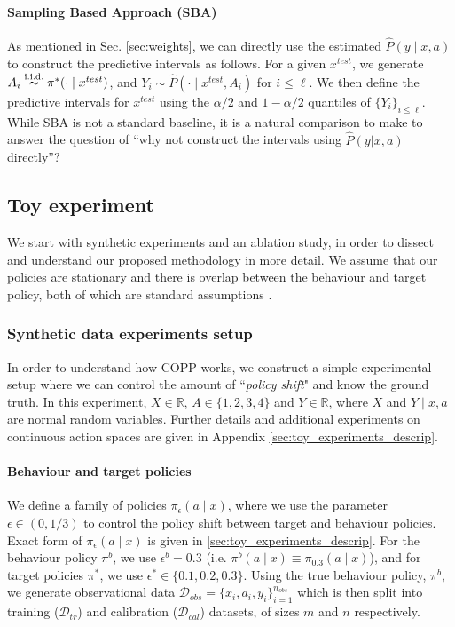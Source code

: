 \paragraph{Sampling Based Approach (SBA)} As mentioned in Sec. \ref{sec:weights}, we can directly use the estimated $\hat{P}(y\mid x, a)$ to construct the predictive intervals as follows. For a given $x^{test}$, we generate $A_i \overset{\textup{i.i.d.}}{\sim} \pi^*(\cdot \mid x^{test})$, and $Y_i \sim \hat{P}(\cdot \mid x^{test}, A_i)$ for $i \leq \ell$. We then define the predictive intervals for $x^{test}$ using the $\alpha/2$ and $1-\alpha/2$ quantiles of $\{Y_i\}_{i \leq \ell}$. While SBA is not a standard baseline, it is a natural comparison to make to answer the question of ``why not construct the intervals using $\hat{P}(y|x, a)$ directly''?


\subsection{Toy experiment}\label{sec:exp_toy} 
 We start with synthetic experiments and an ablation study, in order to dissect and understand our proposed methodology in more detail. We assume that our policies are stationary and there is overlap between the behaviour and target policy, both of which are standard assumptions \citep{risk-assessment, drobust, ope-rl}.
\subsubsection{Synthetic data experiments setup}

In order to understand how COPP works, we construct a simple experimental setup where we can control the amount of ``\textit{policy shift}" and know the ground truth. In this experiment, $X \in \mathbb{R}$, $A \in \{1, 2, 3, 4\}$ and $Y \in \mathbb{R}$, where $X$ and $Y\mid x, a$ are normal random variables. Further details and additional experiments on continuous action spaces are given in Appendix \ref{sec:toy_experiments_descrip}.   

\paragraph{Behaviour and target policies}
We define a family of policies $\pi_\epsilon(a \mid x)$, where we use the parameter $\epsilon \in (0,1/3)$ to control the policy shift between target and behaviour policies. Exact form of $\pi_\epsilon(a \mid x)$ is given in \ref{sec:toy_experiments_descrip}. For the behaviour policy $\pi^b$, we use $\epsilon^b = 0.3$ (i.e. $\pi^b(a \mid x) \equiv  \pi_{0.3}(a \mid x)$), and for target policies $\pi^*$, we use $\epsilon^* \in \{0.1, 0.2, 0.3\}$. Using the true behaviour policy, $\pi^b$, we generate observational data $\mathcal{D}_{obs} = \{x_i, a_i, y_i\}_{i=1}^{n_{obs}}$ which is then split into training ($\mathcal{D}_{tr}$) and calibration ($\mathcal{D}_{cal}$) datasets, of sizes $m$ and $n$ respectively.

